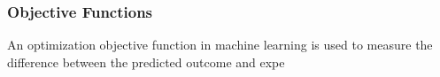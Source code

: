 \subsubsection{Objective Functions}
An optimization objective function in machine learning is used to measure the difference between the predicted outcome and expe